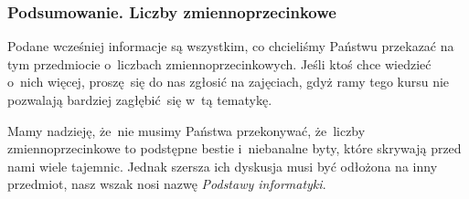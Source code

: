 \documentclass[10pt,t]{beamer}
\begin{document}
\begin{frame}
  \frametitle{Podsumowanie. Liczby zmiennoprzecinkowe}


  Podane wcześniej informacje są wszystkim, co chcieliśmy Państwu przekazać
  na tym przedmiocie o~liczbach zmiennoprzecinkowych. Jeśli ktoś chce
  wiedzieć o~nich więcej, proszę~się do nas zgłosić na zajęciach, gdyż
  ramy tego kursu nie pozwalają bardziej zagłębić~się w~tą tematykę.

  Mamy nadzieję, że~nie musimy Państwa przekonywać, że~liczby
  zmiennoprzecinkowe to podstępne bestie i~niebanalne byty, które
  skrywają przed nami wiele tajemnic. Jednak szersza ich dyskusja musi
  być odłożona na inny przedmiot, nasz wszak nosi nazwę
  \textit{Podstawy informatyki}.

\end{frame}





















\printbibliography





\end{document}

